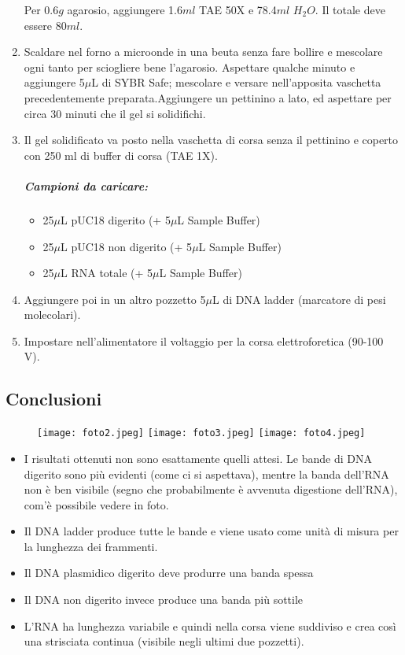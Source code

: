 \documentclass{extarticle}
\begin{document}
\begin{enumerate}
    Per 0.6$g$ agarosio, aggiungere 1.6$ml$ TAE 50X e 78.4$ml$ $H_{2}O$. Il totale deve essere 80$ml$.
    \item Scaldare nel forno a microonde in una beuta senza fare bollire e mescolare ogni tanto per sciogliere bene l'agarosio. Aspettare qualche minuto e aggiungere 5$\mu$L di SYBR Safe; mescolare e versare nell'apposita vaschetta
    precedentemente preparata.Aggiungere un pettinino a lato, ed aspettare per circa 30 minuti che il gel si solidifichi.
    \item Il gel solidificato va posto nella vaschetta di corsa senza il pettinino e coperto con 250 ml di buffer di corsa (TAE 1X).
    \subparagraph{Campioni da caricare:}
        \begin{itemize}
            \item 25$\mu$L pUC18 digerito (+ 5$\mu$L Sample Buffer)
            \item 25$\mu$L pUC18 non digerito (+ 5$\mu$L Sample Buffer)
            \item 25$\mu$L RNA totale (+ 5$\mu$L Sample Buffer)
        \end{itemize}
    \item Aggiungere poi in un altro pozzetto 5$\mu$L di DNA ladder (marcatore di pesi molecolari).
    \item Impostare nell'alimentatore il voltaggio per la corsa elettroforetica (90-100 V).
\end{enumerate}
\newpage
\subsection*{Conclusioni}
\begin{minipage}{0.5\textwidth}
    \begin{figure}[H]
        \texttt{[image: foto2.jpeg]}
        \texttt{[image: foto3.jpeg]}
        \texttt{[image: foto4.jpeg]}
    \end{figure}
    \end{minipage} \hfill
    \begin{minipage}{0.60\textwidth}
    \begin{itemize}
    \item I risultati ottenuti non sono esattamente quelli attesi. Le bande di DNA digerito sono più evidenti (come ci si aspettava), mentre la banda dell'RNA non è ben visibile (segno che probabilmente è avvenuta digestione dell'RNA), com'è possibile vedere in foto.
    \item Il DNA ladder produce tutte le bande e viene usato come unità di misura per la lunghezza dei frammenti.\\
    \item Il DNA plasmidico digerito deve produrre una banda spessa\\
    \item Il DNA non digerito invece produce una banda più sottile\\
    \item L'RNA ha lunghezza variabile e quindi nella corsa viene suddiviso e crea così una strisciata continua (visibile negli ultimi due pozzetti).
    \end{itemize}
\end{minipage}
\end{document}
